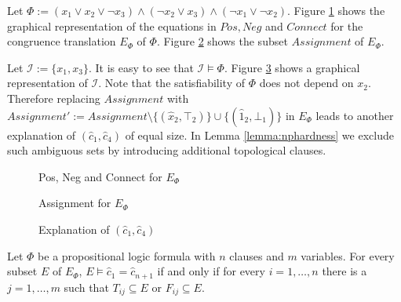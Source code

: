 \begin{example}

Let $\Phi := (x_1 \vee x_2 \vee \neg x_3) \wedge (\neg x_2 \vee x_3) \wedge (\neg x_1 \vee \neg x_2)$. Figure \ref{fig:npexamplebig} shows the graphical representation of the equations in $Pos, Neg$ and $Connect$ for the congruence translation $E_{\Phi}$ of $\Phi$.
Figure \ref{fig:npassignment} shows the subset $Assignment$ of $E_{\Phi}$.

Let $\mathcal{I} := \{x_1,x_3\}$. It is easy to see that $\mathcal{I} \models \Phi$.
Figure \ref{fig:npexplanation} shows a graphical representation of $\mathcal{I}$.
Note that the satisfiability of $\Phi$ does not depend on $x_2$. 
Therefore replacing $Assignment$ with $Assignment' := Assignment \setminus \{(\hat{x}_2,\top_2)\} \cup \{(\hat{1}_2,\bot_1)\}$ in $E_{\Phi}$ leads to another explanation of $(\hat{c}_1,\hat{c}_4)$ of equal size.
In Lemma \ref{lemma:nphardness} we exclude such ambiguous sets by introducing additional topological clauses.
\begin{figure}[!h]


\caption{Pos, Neg and Connect for $E_{\Phi}$}
\label{fig:npexamplebig}
\end{figure}


\begin{figure}[!h]


\caption{Assignment for $E_{\Phi}$}
\label{fig:npassignment}
\end{figure}

\begin{figure}[!h]


\caption{Explanation of $(\hat{c}_1,\hat{c}_4)$}
\label{fig:npexplanation}
\end{figure}

\end{example}


\begin{lemma}
\label{lemma:charexpl}

Let $\Phi$ be a propositional logic formula with $n$ clauses and $m$ variables.
For every subset $E$ of $E_{\Phi}$, $E \models \hat{c}_1 = \hat{c}_{n+1}$ if and only if for every $i = 1,\ldots,n$ there is a $j = 1,\ldots,m$ such that $T_{ij} \subseteq E$ or $F_{ij} \subseteq E$.

\end{lemma}

